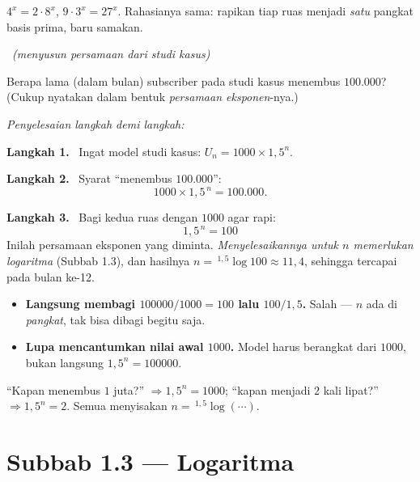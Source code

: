 \documentclass[11pt,a4paper]{report}
\theoremstyle{gaya}
\newcommand{\jawab}{\par\smallskip\noindent\textit{\textcolor{oranye}{Penyelesaian langkah demi langkah:}}\par\smallskip}
\newcommand{\langkah}[1]{\par\smallskip\noindent\textbf{\textcolor{biru}{Langkah #1.}}\ }
\newcommand{\soalno}[2]{%
  \par\bigskip
  \noindent{\large\bfseries\color{ungu}\rule[-2pt]{4pt}{14pt}\ Soal #1}%
  \ {\normalfont\itshape\color{gray}(#2)}\par\nopagebreak\smallskip}
\begin{document}
\begin{variasi}
$4^x = 2\cdot 8^{x}$, $9\cdot3^x = 27^{x}$. Rahasianya sama: rapikan tiap ruas
menjadi \emph{satu} pangkat basis prima, baru samakan.
\end{variasi}

\soalno{1.2.10}{menyusun persamaan dari studi kasus}
\begin{soalbox}{}
Berapa lama (dalam bulan) subscriber pada studi kasus menembus $100.000$?
(Cukup nyatakan dalam bentuk \emph{persamaan eksponen}-nya.)
\end{soalbox}

\jawab
\langkah{1} Ingat model studi kasus: $U_n = 1000\times 1{,}5^{n}$.
\langkah{2} Syarat ``menembus $100.000$'':
\[
1000\times 1{,}5^{\,n} = 100.000.
\]
\langkah{3} Bagi kedua ruas dengan $1000$ agar rapi:
\[
\boxed{\,1{,}5^{\,n} = 100\,}
\]
Inilah persamaan eksponen yang diminta. \emph{Menyelesaikannya untuk $n$
memerlukan logaritma} (Subbab 1.3), dan hasilnya $n=\,{}^{1{,}5}\!\log100\approx
11{,}4$, sehingga tercapai pada bulan ke-12.

\begin{jebakan}
\begin{itemize}[leftmargin=*,topsep=2pt]
  \item \textbf{Langsung membagi $100000/1000=100$ lalu $100/1{,}5$.} Salah ---
  $n$ ada di \emph{pangkat}, tak bisa dibagi begitu saja.
  \item \textbf{Lupa mencantumkan nilai awal $1000$.} Model harus berangkat dari
  $1000$, bukan langsung $1{,}5^n=100000$.
\end{itemize}
\end{jebakan}

\begin{variasi}
``Kapan menembus $1$ juta?'' $\Rightarrow 1{,}5^n=1000$; ``kapan menjadi $2$ kali
lipat?'' $\Rightarrow 1{,}5^n=2$. Semua menyisakan $n=\,{}^{1{,}5}\!\log(\cdots)$.
\end{variasi}

\section*{Subbab 1.3 — Logaritma}
\end{document}
